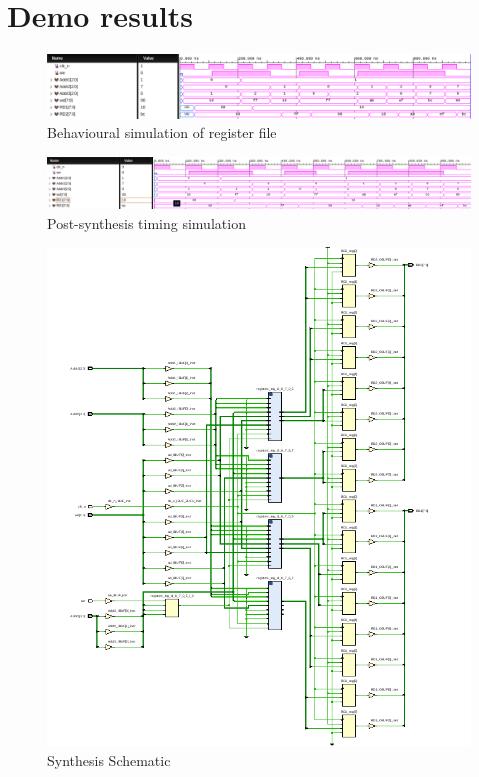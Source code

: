 \documentclass[CMPE]{../KGCOEReport}
\begin{document}
    \pagebreak

    \section*{Demo results}
    \begin{figure}[h!]
        \centering
        \includegraphics[width=\textwidth]{img/behaviour}
        \caption{Behavioural simulation of register file}
        \label{fig:demo1}
    \end{figure}

    \begin{figure}[h!]
        \centering
        \includegraphics[width=\textwidth]{img/synthesis-timing}
        \caption{Post-synthesis timing simulation}
        \label{fig:demo2}
    \end{figure}
    \begin{figure}[h!]
        \centering
        \includegraphics[width=\textwidth]{img/schematic}
        \caption{Synthesis Schematic}
        \label{fig:demo3}
    \end{figure}
\end{document}
